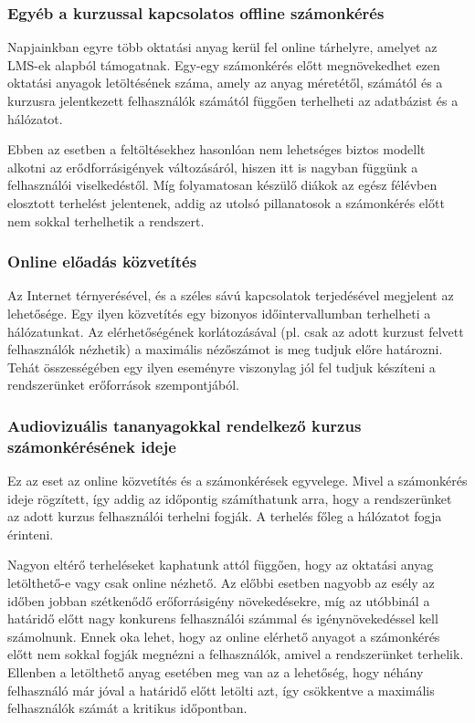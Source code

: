 \subsubsection{Egyéb a kurzussal kapcsolatos offline számonkérés}

Napjainkban egyre több oktatási anyag kerül fel online tárhelyre, amelyet az LMS-ek alapból támogatnak. Egy-egy számonkérés előtt megnövekedhet ezen oktatási anyagok letöltésének száma, amely az anyag méretétől, számától és a kurzusra jelentkezett felhasználók számától függően terhelheti az adatbázist és a hálózatot.

Ebben az esetben a feltöltésekhez hasonlóan nem lehetséges biztos modellt alkotni az erődforrásigények változásáról, hiszen itt is nagyban függünk a felhasználói viselkedéstől. Míg folyamatosan készülő diákok az egész félévben elosztott terhelést jelentenek, addig az utolsó pillanatosok a számonkérés előtt nem sokkal terhelhetik a rendszert. 

\subsubsection{Online előadás közvetítés}

Az Internet térnyerésével, és a széles sávú kapcsolatok terjedésével megjelent az  lehetősége. Egy ilyen közvetítés egy bizonyos időintervallumban terhelheti a hálózatunkat. Az elérhetőségének korlátozásával (pl. csak az adott kurzust felvett felhasználók nézhetik) a maximális nézőszámot is meg tudjuk előre határozni. Tehát összességében egy ilyen eseményre viszonylag jól fel tudjuk készíteni a rendszerünket erőforrások szempontjából.  

\subsubsection{Audiovizuális tananyagokkal rendelkező kurzus számonkérésének ideje}

Ez az eset az online közvetítés és a számonkérések egyvelege. Mivel a számonkérés ideje rögzített, így addig az időpontig számíthatunk arra, hogy a rendszerünket az adott kurzus felhasználói terhelni fogják. A terhelés főleg a hálózatot fogja érinteni.

Nagyon eltérő terheléseket kaphatunk attól függően, hogy az oktatási anyag letölthető-e vagy csak online nézhető. Az előbbi esetben nagyobb az esély az időben jobban szétkenődő erőforrásigény növekedésekre, míg az utóbbinál a határidő előtt nagy konkurens felhasználói számmal és igénynövekedéssel kell számolnunk. Ennek oka lehet, hogy az online elérhető anyagot a számonkérés előtt nem sokkal fogják megnézni a felhasználók, amivel a rendszerünket terhelik. Ellenben a letölthető anyag esetében meg van az a lehetőség, hogy néhány felhasználó már jóval a határidő előtt letölti azt, így csökkentve a maximális felhasználók számát a kritikus időpontban.

